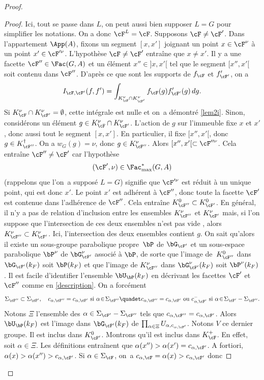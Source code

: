 \begin{proof}
\begin{proof}
Ici, tout se passe dans $L$, on peut aussi bien supposer $L=G$ pour simplifier les notations. On a donc $\cF^L=\cF$. Supposons $\cF\neq\cF'$. Dans l'appartement $\App(A)$, fixons
un segment $[x,x']$ joignant un point $x\in \cF^{\nu}$ à un point $x'\in \cF^{\prime\nu}$. L'hypothèse $\cF\neq\cF'$ entraîne que $x\neq x'$. Il y a une facette $\cF''\in \Fac(G,A)$ et un élément $x''\in{}]x,x'[$ tel que le segment $[x'',x'[$ soit contenu dans $\cF''$. D'après ce que sont les supports de $f_{\cF}$ et $f'_{\cF'}$, on a
\[
I_{\cF,\cF'}(f,f')=\int_{K_{\cF}^{\nu}\cap K_{\cF'}^{\nu}}f_{\cF}(g)f'_{\cF'}(g)\, dg.
\]
Si $K_{\cF}^{\nu}\cap K_{\cF'}^{\nu}=\emptyset$, cette intégrale est nulle et on~a démontré \eqref{lem2i}. Sinon, considérons un élément $g\in K_{\cF}^{\nu}\cap K_{\cF'}^{\nu}$. L'action de $g$ sur l'immeuble fixe $x$ et $x'$, donc aussi tout le segment $[x,x']$. En particulier, il fixe $[x'',x'[$, donc $g\in K_{\cF''}^{\dag}$. On a $w_{G}(g)=\nu$, donc $g\in K_{\cF''}^{\nu}$. Alors $[x'',x'[\subset \cF^{\prime\prime\nu}$. Cela entraîne $\cF''\neq\cF'$ car l'hypothèse
\[
(\cF',\nu)\in \Fac^*_{\max}(G,A)
\]
(rappelons que l'on~a supposé $L=G$) signifie que $\cF^{\prime\nu}$ est réduit à un unique point, qui est donc $x'$. Le point $x'$ est adhérent à $\cF''$, donc toute la facette $\cF'$ est contenue dans l'adhérence de $\cF''$. Cela entraîne $K_{\cF''}^0\subset K_{\cF'}^0$. En général, il n'y a pas de relation d'inclusion entre les ensembles $K_{\cF''}^{\nu}$ et $K_{\cF'}^{\nu}$ mais, si l'on suppose que l'intersection de ces deux ensembles n'est pas vide , alors $K_{\cF''}^{\nu}\subset K_{\cF'}^{\nu}$. Ici, l'intersection des deux ensembles contient $g$.
On sait qu'alors il existe un sous-groupe parabolique propre~$\bP$ de $\bG_{\cF'}$ et un sous-espace parabolique $\bP^{\nu}$ de $\bG_{\cF'}^{\nu}$ associé à $\bP$, de sorte que l'image de~$K_{\cF''}^{0}$ dans $\bG_{\cF'}(k_{F})$ soit $\bP(k_{F})$ et que l'image de $K_{\cF''}^{\nu} $ dans $\bG_{\cF'}^{\nu}(k_{F})$ soit $\bP^{\nu}(k_{F})$. Il est facile d'identifier l'ensemble $\bU_{\bP}(k_{F})$ en décrivant les facettes $\cF'$ et $\cF''$ comme en \ref{description}. On a forcément
\[
\Sigma_{\cF''}\subset \Sigma_{\cF'},\quad c_{\alpha,\cF''}=c_{\alpha,\cF'}\text{ si }\alpha\!\in\!\Sigma_{\cF''}\quadet c_{\alpha,\cF''}=c_{\alpha,\cF'}\text{ ou }c_{\alpha,\cF'}^-\text{ si }\alpha\!\in\!\Sigma_{\cF'}-\Sigma_{\cF''}.
\]
Notons $\Xi$ l'ensemble des $\alpha\in \Sigma_{\cF'}-\Sigma_{\cF''}$ tels que $c_{\alpha,\cF''}=c_{\alpha,\cF'}$. Alors $\bU_{\bP}(k_{F})$ est l'image dans $\bG_{\cF'}(k_{F})$ de $\prod_{\alpha\in \Xi}U_{\alpha,c_{\alpha,\cF'}}$. Notons $V$ ce dernier groupe. Il est inclus dans $K_{\cF'}^0$. Montrons qu'il est inclus dans $K_{\cF}^+$. En effet, soit $\alpha\in \Xi$. Les définitions entraînent que $\alpha(x'')> \alpha(x')=c_{\alpha,\cF'}$. A fortiori, $\alpha(x)> \alpha(x'')> c_{\alpha,\cF'}$. Si $\alpha\in \Sigma_{\cF}$, on~a $c_{\alpha,\cF}=\alpha(x)> c_{\alpha,\cF'}$ donc

\end{proof}
\end{proof}
